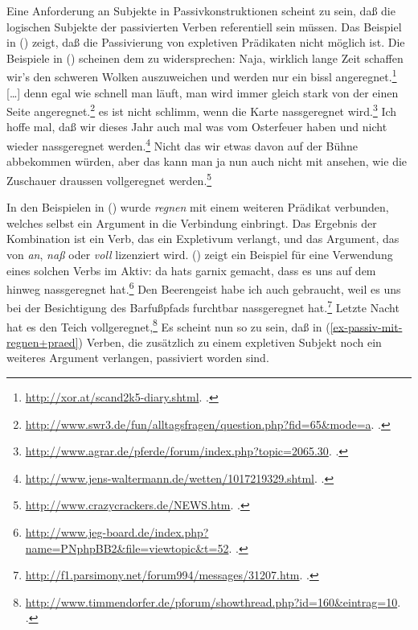Eine Anforderung an Subjekte in Passivkonstruktionen scheint zu sein, daß
die logischen Subjekte der passivierten Verben referentiell sein müssen. Das Beispiel
in () zeigt, daß die Passivierung von expletiven Prädikaten nicht
möglich ist.
\z
Die Beispiele in () scheinen dem zu widersprechen:
\eal\label{ex-passiv-mit-regnen+praed}
\ex Naja, wirklich lange Zeit schaffen wir's den schweren Wolken auszuweichen und
werden nur ein bissl angeregnet.\footnote{
\url{http://xor.at/scand2k5-diary.shtml}. .
}
\ex {}[\ldots] denn egal wie schnell man läuft, man wird immer gleich
stark von der einen Seite angeregnet.\footnote{
  \url{http://www.swr3.de/fun/alltagsfragen/question.php?fid=65&mode=a}. .
}
\ex es ist nicht schlimm, wenn die Karte nassgeregnet wird.\footnote{
\url{http://www.agrar.de/pferde/forum/index.php?topic=2065.30}. .%
}
\ex Ich hoffe mal, daß wir dieses Jahr auch mal was vom Osterfeuer haben und nicht wieder nassgeregnet werden.\footnote{
  \url{http://www.jens-waltermann.de/wetten/1017219329.shtml}. .
}
\ex Nicht das wir etwas davon auf der Bühne abbekommen würden, 
    aber das kann man ja nun auch nicht mit ansehen, wie die Zuschauer draussen vollgeregnet werden.\footnote{
\url{http://www.crazycrackers.de/NEWS.htm}. .
}

\zl
In den Beispielen in () wurde \emph{regnen} mit einem weiteren Prädikat verbunden, welches
selbst ein Argument in die Verbindung einbringt. Das Ergebnis der Kombination ist ein Verb,
das ein Expletivum verlangt, und das Argument, das von \emph{an}, \emph{naß} oder \emph{voll}
lizenziert wird. () zeigt ein Beispiel für eine Verwendung eines solchen Verbs im Aktiv:
\eal
\ex da hats garnix gemacht, dass es uns auf dem hinweg nassgeregnet hat.\footnote{
 \url{http://www.jeg-board.de/index.php?name=PNphpBB2&file=viewtopic&t=52}. .%
}
\ex Den Beerengeist habe ich auch gebraucht, weil es uns bei der Besichtigung des Barfußpfads furchtbar nassgeregnet hat.\footnote{
 \url{http://f1.parsimony.net/forum994/messages/31207.htm}. .%
}
\ex Letzte Nacht hat es den Teich vollgeregnet,\footnote{%
\url{http://www.timmendorfer.de/pforum/showthread.php?id=160&eintrag=10}. .%
}
\zl
Es scheint nun so zu sein, daß in (\ref{ex-passiv-mit-regnen+praed}) Verben, die zusätzlich zu einem expletiven Subjekt noch
ein weiteres Argument verlangen, passiviert worden sind.


